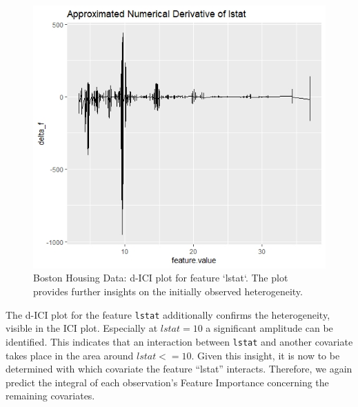 \documentclass[]{krantz}
\begin{document}
\begin{figure}

{\centering \includegraphics[width=0.99\linewidth]{images/03-7-RD2} 

}

\caption{Boston Housing Data: d-ICI plot for feature `lstat`. The plot provides further insights on the initially observed heterogeneity.}\label{fig:fig10}
\end{figure}

The d-ICI plot for the feature \texttt{lstat} additionally confirms the
heterogeneity, visible in the ICI plot. Especially at \(lstat = 10\) a
significant amplitude can be identified. This indicates that an
interaction between \texttt{lstat} and another covariate takes place in
the area around \(lstat <= 10\). Given this insight, it is now to be
determined with which covariate the feature ``lstat'' interacts.
Therefore, we again predict the integral of each observation's Feature
Importance concerning the remaining covariates.
\end{document}
